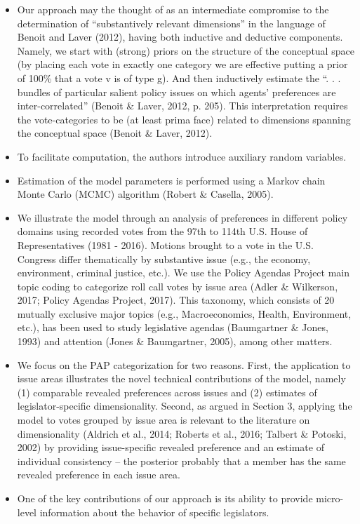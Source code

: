 \documentclass[a4paper,12pt]{article}
\begin{document}
\begin{enumerate}
\begin{itemize}
\item Our approach may the thought of as an intermediate compromise to the determination of “substantively relevant dimensions” in the language of Benoit and Laver (2012), having both inductive and deductive components. Namely, we start with (strong) priors on the structure of the conceptual space (by placing each vote in exactly one category we are effective putting a prior of 100\% that a vote v is of type g). And then inductively estimate the “. . . bundles of particular salient policy issues on which agents’ preferences are inter-correlated” (Benoit \& Laver, 2012, p. 205). This interpretation requires the vote-categories to be (at least prima face) related to dimensions spanning the conceptual space (Benoit \& Laver, 2012). 
\item To facilitate computation, the authors introduce auxiliary random variables.
\item Estimation of the model parameters is performed using a Markov chain Monte Carlo (MCMC) algorithm (Robert \& Casella, 2005). 
\item We illustrate the model through an analysis of preferences in different policy domains using recorded votes from the 97th to 114th U.S. House of Representatives (1981 - 2016). Motions brought to a vote in the U.S. Congress differ thematically by substantive issue (e.g., the economy, environment, criminal justice, etc.). We use the Policy Agendas Project main topic coding to categorize roll call votes by issue area (Adler \& Wilkerson, 2017; Policy Agendas Project, 2017). This taxonomy, which consists of 20 mutually exclusive major topics (e.g., Macroeconomics, Health, Environment, etc.), has been used to study legislative agendas (Baumgartner \& Jones, 1993) and attention (Jones \& Baumgartner, 2005), among other matters. 
\item We focus on the PAP categorization for two reasons. First, the application to issue areas illustrates the novel technical contributions of the model, namely (1) comparable revealed preferences across issues and (2) estimates of legislator-specific dimensionality. Second, as argued in Section 3, applying the model to votes grouped by issue area is relevant to the literature on dimensionality (Aldrich et al., 2014; Roberts et al., 2016; Talbert \& Potoski, 2002) by providing issue-specific revealed preference and an estimate of individual consistency – the posterior probably that a member has the same revealed preference in each issue area.
\item One of the key contributions of our approach is its ability to provide micro-level information about the behavior of specific legislators. 

\end{itemize}
\end{enumerate}
\end{document}
